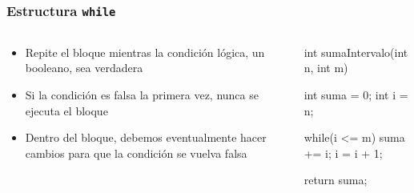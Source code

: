 \documentclass{beamer}
\begin{document}
\begin{frame}[fragile]
  \frametitle{Estructura \texttt{while}}

  \begin{columns}
    \begin{column}{0.4\textwidth}
          \begin{itemize}
          \item Repite el bloque mientras la condición lógica, un
            booleano, sea verdadera
            
          \item Si la condición es falsa la primera vez, nunca se
            ejecuta el bloque
            
          \item Dentro del bloque, debemos eventualmente hacer cambios
            para que la condición se vuelva falsa

          \end{itemize}      
    \end{column}
    \begin{column}{0.6\textwidth}
      \begin{jsmall}
        int sumaIntervalo(int n, int m) {
          int suma = 0;
          int i = n;

          while(i <= m) {
            suma += i;
            i = i + 1;            
          }

          return suma;
        }
      \end{jsmall}
    \end{column}
  \end{columns}

\end{frame}
\end{document}
